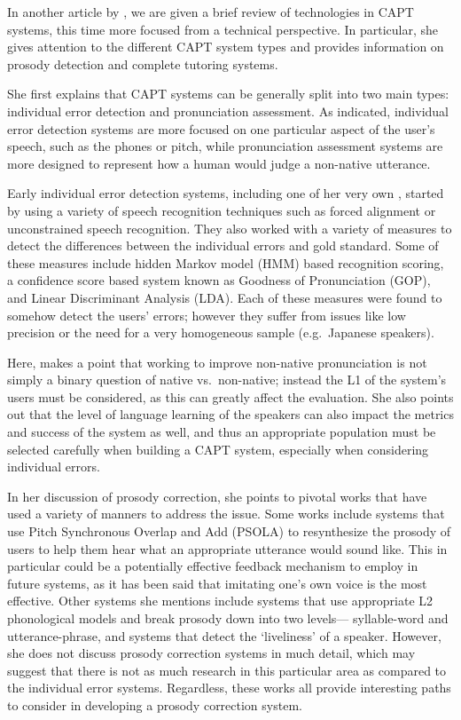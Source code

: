 \documentclass
[
    a4paper,
    twoside,
    12pt
]
{report}
\begin{document}
In another article by \textcite{eskenazi2009}, we are given a brief
review of technologies in CAPT systems, this time more focused from a
technical perspective. In particular, she gives attention to the
different CAPT system types and provides information on prosody
detection and complete tutoring systems.

She first explains that CAPT systems can be generally split into two
main types: individual error detection and pronunciation assessment. As
indicated, individual error detection systems are more focused on one
particular aspect of the user's speech, such as the phones or pitch,
while pronunciation assessment systems are more designed to represent
how a human would judge a non-native utterance.

Early individual error detection systems, including one of her very own
\textcite{eskenazi1998}, started by using a variety of speech
recognition techniques such as forced alignment or unconstrained speech
recognition. They also worked with a variety of measures to detect the
differences between the individual errors and gold standard. Some of
these measures include hidden Markov model (HMM) based recognition
scoring, a confidence score based system known as Goodness of
Pronunciation (GOP), and Linear Discriminant Analysis (LDA). Each of
these measures were found to somehow detect the users' errors; however
they suffer from issues like low precision or the need for a very
homogeneous sample (e.g.~Japanese speakers).

Here, \textcite{eskenazi2009} makes a point that working to improve
non-native pronunciation is not simply a binary question of native
vs.~non-native; instead the L1 of the system's users must be considered,
as this can greatly affect the evaluation. She also points out that the
level of language learning of the speakers can also impact the metrics
and success of the system as well, and thus an appropriate population
must be selected carefully when building a CAPT system, especially when
considering individual errors.

In her discussion of prosody correction, she points to pivotal works
that have used a variety of manners to address the issue. Some works
include systems that use Pitch Synchronous Overlap and Add (PSOLA) to
resynthesize the prosody of users to help them hear what an appropriate
utterance would sound like. This in particular could be a potentially
effective feedback mechanism to employ in future systems, as it has been
said that imitating one's own voice is the most effective. Other systems
she mentions include systems that use appropriate L2 phonological models
and break prosody down into two levels--- syllable-word and
utterance-phrase, and systems that detect the `liveliness' of a speaker.
However, she does not discuss prosody correction systems in much detail,
which may suggest that there is not as much research in this particular
area as compared to the individual error systems. Regardless, these
works all provide interesting paths to consider in developing a prosody
correction system.
\end{document}
